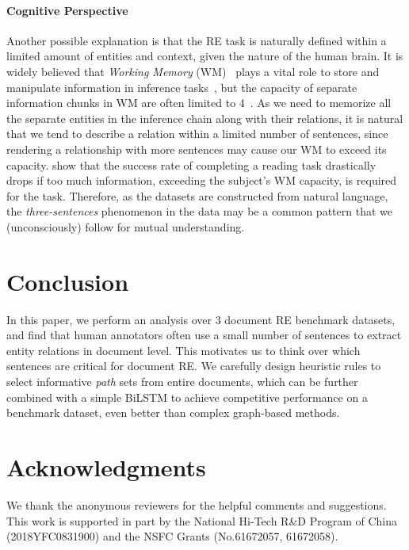 \documentclass[11pt,a4paper]{article}
\begin{document}
\paragraph{Cognitive Perspective} 
Another possible explanation is that the RE task is naturally defined within a limited amount of entities and context, given the nature of the human brain. It is widely believed that \textit{Working Memory} (WM)~\cite{baddeley1992working} plays a vital role to store and manipulate information in inference tasks~\cite{barreyro2012working}, but the capacity of separate information chunks in WM are often limited to 4~\cite{cowan2001magical}. As we need to memorize all the separate entities in the inference chain along with their relations, 
it is natural that we tend to describe a relation within a limited number of sentences,
since rendering a relationship with more sentences may cause our WM to exceed its capacity. \citet{daneman1980individual} show that the success rate of completing a reading task drastically drops if too much information, exceeding the subject’s WM capacity, is required for the task. Therefore, as the datasets are constructed from natural language, the \textit{three-sentences} phenomenon in the data may be a common pattern that we (unconsciously) follow for mutual understanding.



\section{Conclusion}
In this paper, we perform an analysis over 3 document RE benchmark datasets, and find that human annotators often use a small number of sentences  to extract entity relations in document level. 
This motivates us to think over which sentences are critical for document RE. We carefully design heuristic rules to select informative \textit{path} sets from entire documents, which can be further combined with a simple BiLSTM to achieve competitive performance on a benchmark dataset, even better than complex graph-based methods.  


\section*{Acknowledgments}
We thank the anonymous reviewers for the helpful comments and suggestions. This work is supported in part by the National Hi-Tech R\&D Program of China (2018YFC0831900) and the NSFC Grants (No.61672057, 61672058).



\end{document}
